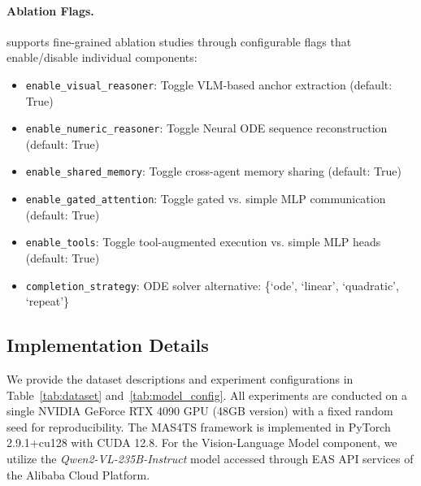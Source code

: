 \paragraph{Ablation Flags.}
\model supports fine-grained ablation studies through configurable flags that enable/disable individual components:
\begin{itemize}[leftmargin=*, itemsep=1pt]
    \item \texttt{enable\_visual\_reasoner}: Toggle VLM-based anchor extraction (default: True)
    \item \texttt{enable\_numeric\_reasoner}: Toggle Neural ODE sequence reconstruction (default: True)
    \item \texttt{enable\_shared\_memory}: Toggle cross-agent memory sharing (default: True)
    \item \texttt{enable\_gated\_attention}: Toggle gated vs. simple MLP communication (default: True)
    \item \texttt{enable\_tools}: Toggle tool-augmented execution vs. simple MLP heads (default: True)
    \item \texttt{completion\_strategy}: ODE solver alternative: \{`ode', `linear', `quadratic', `repeat'\}
\end{itemize}



\subsection{Implementation Details}
We provide the dataset descriptions and experiment configurations in Table~\ref{tab:dataset} and~\ref{tab:model_config}. All experiments are conducted on a single NVIDIA GeForce RTX 4090 GPU (48GB version) with a fixed random seed for reproducibility. The MAS4TS framework is implemented in PyTorch 2.9.1+cu128 with CUDA 12.8. For the Vision-Language Model component, we utilize the \textit{Qwen2-VL-235B-Instruct} model accessed through EAS API services of the Alibaba Cloud Platform. 